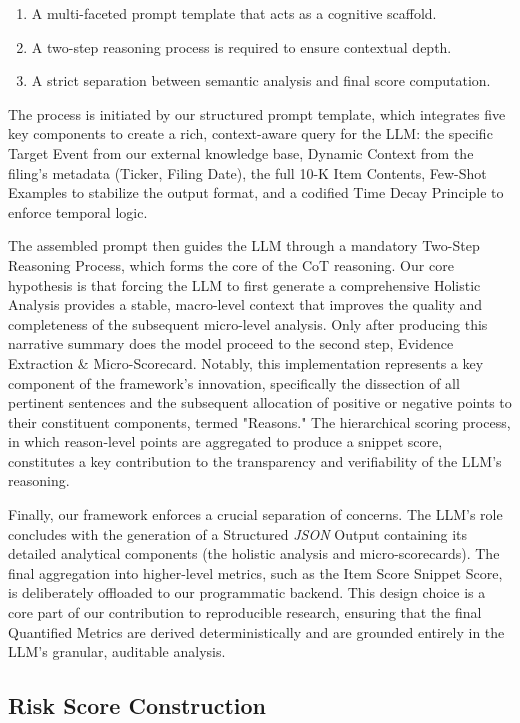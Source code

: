\documentclass[sigconf]{acmart}
\begin{document}
\begin{enumerate}
    \item A multi-faceted prompt template that acts as a cognitive scaffold.
    \item A two-step reasoning process is required to ensure contextual depth.
    \item A strict separation between semantic analysis and final score computation.
\end{enumerate}

The process is initiated by our structured prompt template, which integrates five key components to create a rich, context-aware query for the LLM: the specific Target Event from our external knowledge base, Dynamic Context from the filing's metadata (Ticker, Filing Date), the full 10-K Item Contents, Few-Shot Examples to stabilize the output format, and a codified Time Decay Principle to enforce temporal logic. 

The assembled prompt then guides the LLM through a mandatory Two-Step Reasoning Process, which forms the core of the CoT reasoning.
Our core hypothesis is that forcing the LLM to first generate a comprehensive Holistic Analysis provides a stable, macro-level context that improves the quality and completeness of the subsequent micro-level analysis. Only after producing this narrative summary does the model proceed to the second step, Evidence Extraction \& Micro-Scorecard. Notably, this implementation represents a key component of the framework's innovation, specifically the dissection of all pertinent sentences and the subsequent allocation of positive or negative points to their constituent components, termed "Reasons." The hierarchical scoring process, in which reason-level points are aggregated to produce a snippet score, constitutes a key contribution to the transparency and verifiability of the LLM's reasoning.

Finally, our framework enforces a crucial separation of concerns. The LLM's role concludes with the generation of a Structured \textit{JSON} Output containing its detailed analytical components (the holistic analysis and micro-scorecards). The final aggregation into higher-level metrics, such as the Item Score Snippet Score, is deliberately offloaded to our programmatic backend. This design choice is a core part of our contribution to reproducible research, ensuring that the final Quantified Metrics are derived deterministically and are grounded entirely in the LLM's granular, auditable analysis.

\subsection{Risk Score Construction} 
\end{document}

